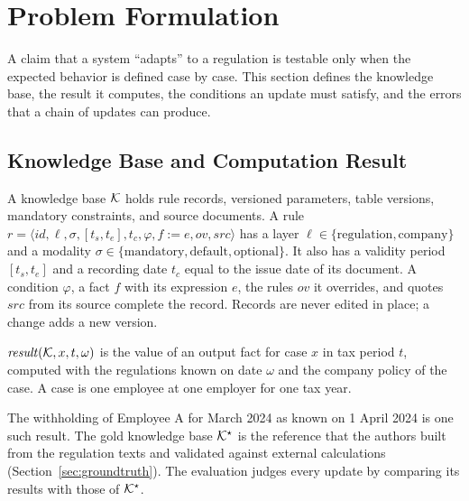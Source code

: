 \section{Problem Formulation}
\label{sec:formulation}
A claim that a system ``adapts'' to a regulation is testable only when the expected behavior is defined case by case. This section defines the knowledge base, the result it computes, the conditions an update must satisfy, and the errors that a chain of updates can produce.

\subsection{Knowledge Base and Computation Result}
\begin{definition}
\label{def:kb}
A knowledge base $\mathcal{K}$ holds rule records, versioned parameters, table versions, mandatory constraints, and source documents. A rule $r = \langle \mathit{id}, \ell, \sigma, [t_s, t_e], t_c, \varphi, f \mathrel{:=} e, \mathit{ov}, \mathit{src} \rangle$ has a layer $\ell \in \{\text{regulation}, \text{company}\}$ and a modality $\sigma \in \{\text{mandatory}, \text{default}, \text{optional}\}$. It also has a validity period $[t_s, t_e]$ and a recording date $t_c$ equal to the issue date of its document. A condition $\varphi$, a fact $f$ with its expression $e$, the rules $\mathit{ov}$ it overrides, and quotes $\mathit{src}$ from its source complete the record. Records are never edited in place; a change adds a new version.
\end{definition}

\begin{definition}
\label{def:result}
$\mathit{result}(\mathcal{K}, x, t, \omega)$ is the value of an output fact for case $x$ in tax period $t$, computed with the regulations known on date $\omega$ and the company policy of the case. A case is one employee at one employer for one tax year.
\end{definition}

The withholding of Employee A for March 2024 as known on 1 April 2024 is one such result. The gold knowledge base $\mathcal{K}^\star$ is the reference that the authors built from the regulation texts and validated against external calculations (Section~\ref{sec:groundtruth}). The evaluation judges every update by comparing its results with those of $\mathcal{K}^\star$.

